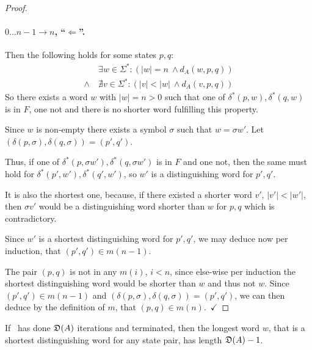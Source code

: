 \begin{proof}
	\paragraph*{$0\ldots n-1 \rightarrow n$, ``$\Leftarrow$''.} 
	Then the following holds for some states $p,q$:
	\begin{align*}
	&\exists w\in\Sigma^*\colon (|w| = n\ \land d_A(w, p, q))\\
	\land\ &\nexists v\in\Sigma^*\colon (|v| < |w|\ \land d_A(v, p, q))
	\end{align*}
	So there exists a word $w$ with $|w|=n>0$ such that one of $\delta^*(p, w),\delta^*(q, w)$ is in $F$, one not and there is no shorter word fulfilling this property.
	
	Since $w$ is non-empty there exists a symbol $\sigma$ such that $w = \sigma w'$. Let $(\delta(p,\sigma),\delta(q,\sigma)) = (p',q')$.
	
	Thus, if one of $\delta^*(p, \sigma w'),\delta^*(q, \sigma w')$ is in $F$ and one not, then the same must hold for $\delta^*(p', w'),\delta^*(q', w')$, so $w'$ is a distinguishing word for $p',q'$.
	
	It is also the shortest one, because, if there existed a shorter word $v'$, $|v'| < |w'|$, then $\sigma v'$ would be a distinguishing word shorter than $w$ for $p,q$ which is contradictory.
	
	Since $w'$ is a shortest distinguishing word for $p',q'$, we may deduce now per induction, that $(p',q')\in m(n-1)$.
	
	The pair $(p,q)$ is not in any $m(i)$, $i<n$, since else-wise per induction the shortest distinguishing word would be shorter than $w$ and thus not $w$. Since $(p',q')\in m(n-1)$ and $(\delta(p,\sigma),\delta(q,\sigma)) = (p',q')$, we can then deduce by the definition of $m$, that $(p,q)\in m(n)$.\ $\checkmark$ 
\end{proof}

\begin{lemma}\label{ch:3:semantics-of-D(A)}
    If \CompDist\ has done $\mathfrak{D}(A)$ iterations and terminated, then the longest word $w$, that is a shortest distinguishing word for any state pair, has length $\mathfrak{D}(A)-1$.
\end{lemma}

